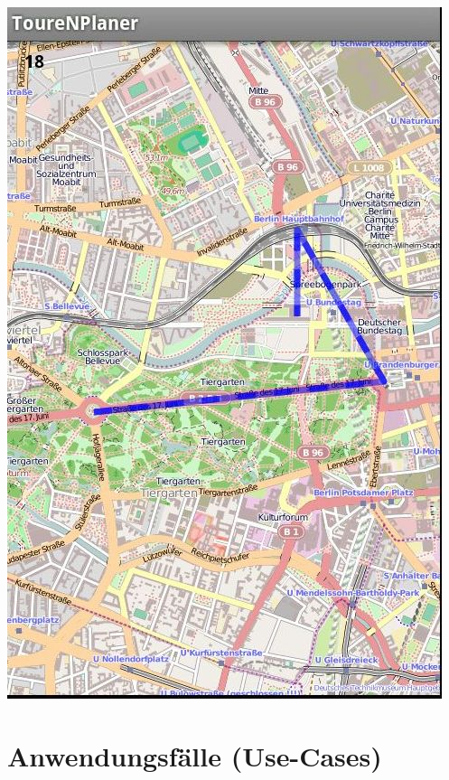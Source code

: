 \documentclass[a4paper,10pt,titlepage]{article}
\makeatletter
\newcommand\novspace{\@minipagetrue}
\newenvironment{owncompactitem}{%
\compactitem
}{%
\@finalstrut\@arstrutbox
\@nameuse{endcompactitem}%
\aftergroup\let\aftergroup\@finalstrut\aftergroup\@gobble
}
\newenvironment{owncompactenum}{%
\compactenum
}{%
\@finalstrut\@arstrutbox
\@nameuse{endcompactenum}%
\aftergroup\let\aftergroup\@finalstrut\aftergroup\@gobble
}
\newcommand{\usecase}[7]
{\subsection{#1}
\setlength{\extrarowheight}{2pt}
\begin{tabular}{|p{0.2\textwidth}|p{0.9\textwidth}|}
\hline
  Akteure & #2\\\hline
  Ziel & #3\\\hline
  Vorbedingungen & \novspace
  	\begin{owncompactitem}[-] #4 \end{owncompactitem} \\\hline
  Normalablauf & \vspace{-7pt}
  	\begin{owncompactenum}[1.] #6 \end{owncompactenum} \\\hline
  Nachbedingungen & \novspace
  	\begin{owncompactitem}[-] #5 \end{owncompactitem} \\\hline
  #7
\end{tabular}
}
\newcommand{\sonderfall}[4][\empty]
{
Sonderfall #2 & \vspace{-10pt}
	\textit{#3}
	\begin{owncompactenum}[{#2}.1] {#4} \end{owncompactenum}
  	\ifthenelse{\equal{#1}{\empty}}
    	{\\\hline} %
    	{\ensuremath{\rightarrow} #1 \\ [+1pt] \hline} %

}
\newcommand{\sondernachbedingung}[1]
{
Nachbedingungen im Sonderfall& \novspace
	\begin{owncompactitem}[-]
		#1
	\end{owncompactitem} \\\hline
}
\makeatother
\begin{document}
\begin {center}
\includegraphics[scale=0.4]{media/android/map.jpg}
\end {center}
\newpage



\clearpage
\section{Anwendungsfälle (Use-Cases)}



\end{document}
